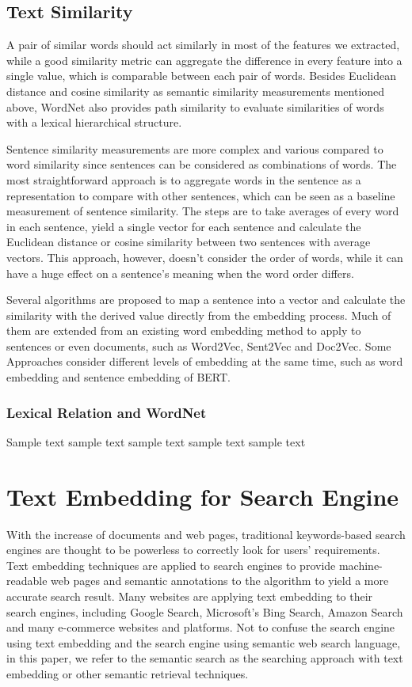 \subsection{Text Similarity}
A pair of similar words should act similarly in most of the features we extracted, while a good similarity metric can aggregate the difference in every feature into a single value, which is comparable between each pair of words.
Besides Euclidean distance and cosine similarity as semantic similarity measurements mentioned above, WordNet also provides path similarity to evaluate similarities of words with a lexical hierarchical structure.

Sentence similarity measurements are more complex and various compared to word similarity since sentences can be considered as combinations of words.
The most straightforward approach is to aggregate words in the sentence as a representation to compare with other sentences, which can be seen as a baseline measurement of sentence similarity.
The steps are to take averages of every word in each sentence, yield a single vector for each sentence and calculate the Euclidean distance or cosine similarity between two sentences with average vectors.
This approach, however, doesn't consider the order of words, while it can have a huge effect on a sentence's meaning when the word order differs.

Several algorithms are proposed to map a sentence into a vector and calculate the similarity with the derived value directly from the embedding process.
Much of them are extended from an existing word embedding method to apply to sentences or even documents, such as Word2Vec, Sent2Vec and Doc2Vec.
Some Approaches consider different levels of embedding at the same time, such as word embedding and sentence embedding of BERT.

\subsubsection{Lexical Relation and WordNet}
Sample text sample text sample text sample text sample text


\section{Text Embedding for Search Engine}
With the increase of documents and web pages, traditional keywords-based search engines are thought to be powerless to correctly look for users' requirements.
Text embedding techniques are applied to search engines to provide machine-readable web pages and semantic annotations to the algorithm to yield a more accurate search result.
Many websites are applying text embedding to their search engines, including Google Search, Microsoft's Bing Search, Amazon Search and many e-commerce websites and platforms.
Not to confuse the search engine using text embedding and the search engine using semantic web search language, in this paper, we refer to the semantic search as the searching approach with text embedding or other semantic retrieval techniques. 

